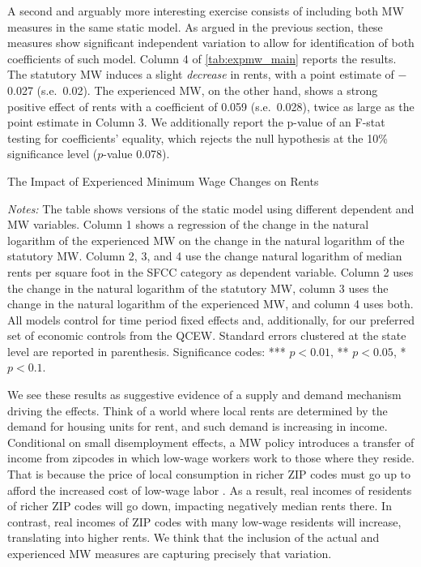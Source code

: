 A second and arguably more interesting exercise consists of including both MW measures in
the same static model. As argued in the previous section, these measures show significant
independent variation to allow for identification of both coefficients of such model. 
Column 4 of \autoref{tab:expmw_main} reports the results. The statutory MW induces
a slight \textit{decrease} in rents, with a point estimate of $-$0.027 (s.e.\ 0.02). The 
experienced MW, on the other hand, shows a strong positive effect of rents with a 
coefficient of 0.059 (s.e.\ 0.028), twice as large as the point estimate in Column 3. We
additionally report the p-value of an F-stat testing for coefficients' equality, which rejects the
null hypothesis at the 10\% significance level ($p$-value 0.078). 

\begin{table}[htb!]\centering
	\caption{The Impact of Experienced Minimum Wage Changes on Rents}
	\label{tab:expmw_main}
	
	\begin{minipage}{0.95\textwidth}\footnotesize
		\vspace{3mm}	
		\textit{Notes:} The table shows versions of the static model using different 
		dependent and MW variables. Column 1 shows a regression of the change in the natural 
		logarithm of the experienced MW on the change in the natural logarithm of the 
		statutory MW. Column 2, 3, and 4 use the change natural logarithm of median rents per 
		square foot in the SFCC category as dependent variable. Column 2 uses the change in 
		the natural logarithm of the statutory MW, column 3 uses the change in the natural 
		logarithm of the experienced MW, and column 4 uses both. All models control for time 
		period fixed effects and, additionally, for our preferred set of economic controls 
		from the QCEW. 
		Standard errors clustered at the state level are reported in parenthesis. Significance 
		codes: *** $p < 0.01$, ** $p < 0.05$, * $p < 0.1$.
	\end{minipage}
\end{table}

We see these results as suggestive evidence of a supply and demand mechanism driving the 
effects. Think of a world where local rents are determined by the demand for housing units for
rent, and such demand is increasing in income. Conditional on small disemployment effects, a MW
policy introduces a transfer of income from zipcodes in which low-wage workers work to those 
where they reside. That is because the price of local consumption in richer ZIP codes must go 
up to afford the increased cost of low-wage labor \parencite[as exemplified by, e.g.,][]
{Allegretto2018}. As a result, real incomes of residents of richer ZIP codes will go down, 
impacting negatively median rents there. In contrast, real incomes of ZIP codes with many 
low-wage residents will increase, translating into higher rents. We think that the inclusion 
of the actual and experienced MW measures are capturing precisely that variation.
